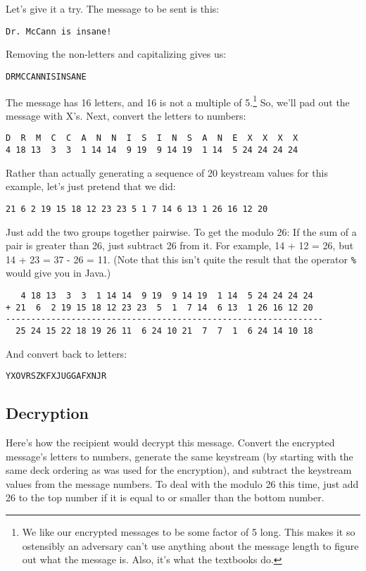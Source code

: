 \documentclass[]{article}
\begin{document}
Let's give it a try.  The message to be sent is this:

\hspace*{0.5cm} \Verb+Dr. McCann is insane!+

Removing the non-letters and capitalizing gives us:

\hspace*{0.5cm} \Verb+DRMCCANNISINSANE+

The message has 16 letters, and 16 is not a multiple of 5.\footnote{We like our encrypted messages to be some factor of 5 long.  This makes it so ostensibly an adversary can't use anything about the message length to figure out what the message is. Also, it's what the textbooks do.}  So,
we'll pad out the message with X's.  Next, convert the letters to numbers:


\begin{verbatim}
D  R  M  C  C  A  N  N  I  S  I  N  S  A  N  E  X  X  X  X
4 18 13  3  3  1 14 14  9 19  9 14 19  1 14  5 24 24 24 24
\end{verbatim}

Rather than actually generating a sequence of 20 keystream values for this
example, let's just pretend that we did:

\hspace*{0.5cm}
\texttt{21  6  2 19 15 18 12 23 23  5  1  7 14  6 13  1 26 16 12 20}

Just add the two groups together pairwise.  To get the modulo 26:
If the sum of a 
pair is greater than 26, just subtract 26 from it.  For example, 14 + 12 
= 26, but 14 + 23 = 37 - 26 = 11.  (Note that this isn't quite the result 
that the operator \verb+%+ would give you in Java.)


\begin{verbatim}
   4 18 13  3  3  1 14 14  9 19  9 14 19  1 14  5 24 24 24 24
+ 21  6  2 19 15 18 12 23 23  5  1  7 14  6 13  1 26 16 12 20
---------------------------------------------------------------
  25 24 15 22 18 19 26 11  6 24 10 21  7  7  1  6 24 14 10 18
\end{verbatim}

And convert back to letters:

\hspace*{0.5cm}
\texttt{YXOVRSZKFXJUGGAFXNJR}


\subsection{Decryption}
Here's how the recipient would decrypt this message.  Convert the encrypted 
message's letters to numbers,
generate the same keystream (by starting with the same deck ordering as was
used for the encryption), and subtract the keystream values from the message
numbers.  To deal with the modulo 26 this time, just add 26 to the top 
number if it is equal to or smaller than the bottom number.
\end{document}
